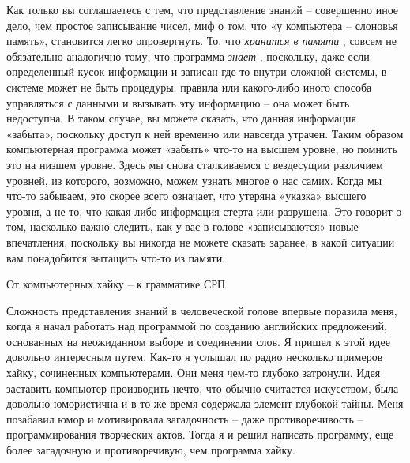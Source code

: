 \documentclass[../main.tex]{subfiles}
\begin{document}
Как только вы соглашаетесь с тем, что представление знаний \--- совершенно иное дело, чем простое записывание чисел, миф о том, что «у компьютера \--- слоновья память», становится легко опровергнуть. То, что \emph{хранится в памяти} , совсем не обязательно аналогично тому, что программа \emph{знает} , поскольку, даже если определенный кусок информации и записан где-то внутри сложной системы, в системе может не быть процедуры, правила или какого-либо иного способа управляться с данными и вызывать эту информацию \--- она может быть недоступна. В таком случае, вы можете сказать, что данная информация «забыта», поскольку доступ к ней временно или навсегда утрачен. Таким образом компьютерная программа может «забыть» что-то на высшем уровне, но помнить это на низшем уровне. Здесь мы снова сталкиваемся с вездесущим различием уровней, из которого, возможно, можем узнать многое о нас самих. Когда мы что-то забываем, это скорее всего означает, что утеряна «указка» высшего уровня, а не то, что какая-либо информация стерта или разрушена. Это говорит о том, насколько важно следить, как у вас в голове «записываются» новые впечатления, поскольку вы никогда не можете сказать заранее, в какой ситуации вам понадобится вытащить что-то из памяти.

От компьютерных хайку \--- к грамматике СРП

Сложность представления знаний в человеческой голове впервые поразила меня, когда я начал работать над программой по созданию английских предложений, основанных на неожиданном выборе и соединении слов. Я пришел к этой идее довольно интересным путем. Как-то я услышал по радио несколько примеров хайку, сочиненных компьютерами. Они меня чем-то глубоко затронули. Идея заставить компьютер производить нечто, что обычно считается искусством, была довольно юмористична и в то же время содержала элемент глубокой тайны. Меня позабавил юмор и мотивировала загадочность \--- даже противоречивость \--- программирования творческих актов. Тогда я и решил написать программу, еще более загадочную и противоречивую, чем программа хайку.
\end{document}
